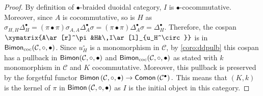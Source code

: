 \documentclass[nosumlimits,twoside]{amsart}
\theoremstyle{definition}
\theoremstyle{remark}
\newcommand{\Cc}{\mathcal{C}}
\def\Bimon{{\sf Bimon}}
\def\Comon{{\sf Comon}}
\def\cBimon{{\sf Bimon}_{\mathrm{coc}}}
\begin{document}
\begin{proof}
By definition of $\bullet$-braided duoidal category, $I$ is $\bullet$-cocommutative. Moreover, since $A$ is cocommutative, so is $H$ as $\sigma_{H,H}\Delta^\bullet_H=(\pi\bullet\pi) \sigma_{A,A}\Delta_A^{\bullet}\sigma=(\pi\bullet\pi) \Delta_A^{\bullet}\sigma=\Delta^{\bullet}_H.$ Therefore, the cospan $\xymatrix{A\ar[r]^\pi&H&\,I\ar[l]_{u_H^\circ}}$
is in $\cBimon(\Cc,\circ,\bullet)$.
Since $u_{H}^{\circ }$ is a monomorphism in $\Cc$, by \cref{coro:ddpulb} this cospan
has a pullback in $\Bimon (\Cc,\circ,\bullet)$ and $\cBimon (\Cc,\circ,\bullet)$ as stated with $k$ monomorphism in $%
\mathcal{C}$ and $K$ cocommutative. Moreover, this pullback is preserved by
the forgetful functor $\Bimon \left( \mathcal{C},\circ,\bullet\right) \rightarrow
\Comon \left( \mathcal{C}^{\bullet }\right) .$
This means that $\left( K,k\right) $ is the kernel of $\pi $ in $\Bimon\left( \mathcal{C},\circ,\bullet\right) $ as $I$ is the initial object in this
category.


\end{proof}
\end{document}

